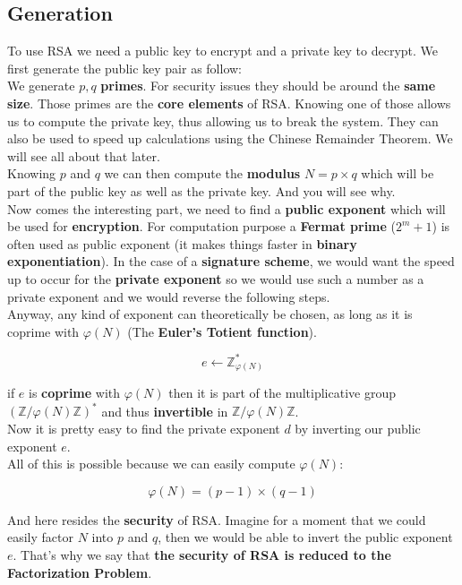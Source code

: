 \documentclass[a4paper,11pt]{article}
\begin{document}
\subsection{Generation}

To use RSA we need a public key to encrypt and a private key to decrypt. We first generate the public key pair as follow:\\

We generate $p, q$ \textbf{primes}. For security issues they should be around the \textbf{same size}. Those primes are the \textbf{core elements} of RSA. Knowing one of those allows us to compute the private key, thus allowing us to break the system. They can also be used to speed up calculations using the Chinese Remainder Theorem. We will see all about that later.\\
Knowing $p$ and $q$ we can then compute the \textbf{modulus} $N = p \times q$ which will be part of the public key as well as the private key. And you will see why.\\

Now comes the interesting part, we need to find a \textbf{public exponent} which will be used for \textbf{encryption}. For computation purpose a \textbf{Fermat prime} ($2^{m} + 1$) is often used as public exponent (it makes things faster in \textbf{binary exponentiation}). In the case of a \textbf{signature scheme}, we would want the speed up to occur for the \textbf{private exponent} so we would use such a number as a private exponent and we would reverse the following steps.\\
Anyway, any kind of exponent can theoretically be chosen, as long as it is coprime with $\varphi(N)$ (The \textbf{Euler's Totient function}).

\[e \leftarrow \mathbb{Z}_{\varphi(N)}^{\ast}\]

if $e$ is \textbf{coprime} with $\varphi(N)$ then it is part of the multiplicative group $(\mathbb{Z}/\varphi(N)\mathbb{Z})^{\ast}$ and thus \textbf{invertible} in $\mathbb{Z}/\varphi(N)\mathbb{Z}$.\\

Now it is pretty easy to find the private exponent $d$ by inverting our public exponent $e$.\\

All of this is possible because we can easily compute $\varphi(N)$:

\[\varphi(N) = (p - 1) \times (q - 1)\]

And here resides the \textbf{security} of RSA. Imagine for a moment that we could easily factor $N$ into $p$ and $q$, then we would be able to invert the public exponent $e$. That's why we say that \textbf{the security of RSA is reduced to the Factorization Problem}.\\
\end{document}
